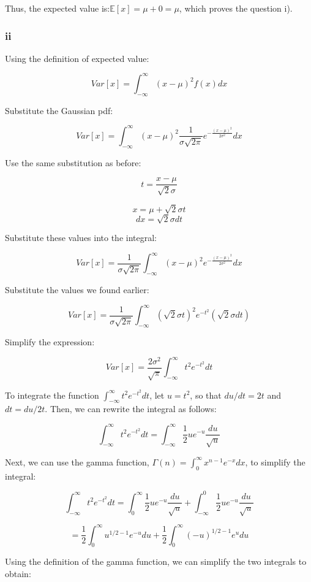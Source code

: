 Thus, the expected value is:$\mathbb{E}[x] = \mu + 0 = \mu$, which proves the question i).

\subsubsection{ii}

Using the definition of expected value:

$$Var[x] = \int_{-\infty}^{\infty} (x-\mu)^2 f(x) dx$$

Substitute the Gaussian pdf:

$$Var[x] = \int_{-\infty}^{\infty} (x-\mu)^2 \frac{1}{\sigma\sqrt{2\pi}} e^{-\frac{(x-\mu)^2}{2\sigma^2}} dx$$

Use the same substitution as before:

$$t = \frac{x-\mu}{\sqrt{2}\sigma}$$

$$x = \mu + \sqrt{2}\sigma t$$
$$dx = \sqrt{2}\sigma dt$$

Substitute these values into the integral:

$$Var[x] = \frac{1}{\sigma\sqrt{2\pi}} \int_{-\infty}^{\infty} (x-\mu)^2 e^{-\frac{(x-\mu)^2}{2\sigma^2}} dx$$

Substitute the values we found earlier:

$$Var[x] = \frac{1}{\sigma\sqrt{2\pi}} \int_{-\infty}^{\infty} (\sqrt{2}\sigma t)^2 e^{-t^2} (\sqrt{2}\sigma dt)$$

Simplify the expression:

$$Var[x] = \frac{2\sigma^2}{\sqrt{\pi}} \int_{-\infty}^{\infty} t^2 e^{-t^2} dt$$

To integrate the function $\int_{-\infty}^{\infty} t^2 e^{-t^2} dt$, let $u=t^2$, so that $du/dt=2t$ and $dt=du/2t$. Then, we can rewrite the integral as follows:

$$\int_{-\infty}^{\infty} t^2 e^{-t^2} dt=\int_{-\infty}^{\infty} \frac{1}{2}u e^{-u} \frac{du}{\sqrt{u}}$$

Next, we can use the gamma function, $\Gamma(n)=\int_{0}^{\infty} x^{n-1}e^{-x}dx$, to simplify the integral:

$$\int_{-\infty}^{\infty} t^2 e^{-t^2} dt=\int_{0}^{\infty} \frac{1}{2}u e^{-u} \frac{du}{\sqrt{u}}+\int_{-\infty}^{0} \frac{1}{2}u e^{-u} \frac{du}{\sqrt{u}}$$

$$=\frac{1}{2}\int_{0}^{\infty} u^{1/2-1}e^{-u}du+\frac{1}{2}\int_{0}^{\infty} (-u)^{1/2-1}e^{u}du$$

Using the definition of the gamma function, we can simplify the two integrals to obtain:

